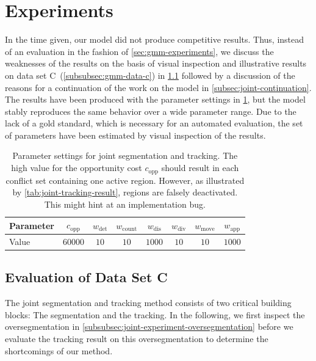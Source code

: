 \section{Experiments}
\label{sec:joint-experiments}
In the time given, our model did not produce competitive results. Thus, instead of an evaluation in
the fashion of \cref{sec:gmm-experiments}, we discuss the weaknesses of the results on the basis of
visual inspection and illustrative results on data set C~(\cref{subsubsec:gmm-data-c}) in
\cref{subsec:joint-experiment-c} followed by a discussion of the reasons for a continuation of the
work on the model in \cref{subsec:joint-continuation}. The results have been produced with the
parameter settings in \cref{tab:joint-experiments-par}, but the model stably reproduces the same
behavior over a wide parameter range. Due to the lack of a gold standard, which is necessary for an
automated evaluation, the set of parameters have been estimated by visual inspection of the results.
\begin{table}
    \centering
    \renewcommand*{\arraystretch}{1.2}
    \begin{tabular}{l|ccccccc}
        \toprule
        Parameter &  
        $c_{\text{opp}}$ &
        $w_{\text{det}}$ & 
        $w_{\text{count}}$ & 
        $w_{\text{dis}}$ & 
        $w_{\text{div}}$ & 
        $w_{\text{move}}$ & 
        $w_{\text{app}}$ \\ \hline
        Value &  $60000$ & $10$ & $10$ & $1000$ & $10$  & $10$ & $1000$ \\
        \bottomrule
    \end{tabular}
    \renewcommand*{\arraystretch}{1.0}
    \caption[Parameter settings for joint segmentation and tracking]{Parameter settings for joint segmentation and tracking. The high value for the
        opportunity cost $c_{\text{opp}}$ should result in each conflict set containing one active
        region. However, as illustrated by \cref{tab:joint-tracking-result}, regions are falsely
        deactivated. This might hint at an implementation bug.}
    \label{tab:joint-experiments-par}
\end{table}

\subsection{Evaluation of Data Set C}
\label{subsec:joint-experiment-c}
The joint segmentation and tracking method consists of two critical building blocks: The
segmentation and the tracking. In the following, we first inspect the oversegmentation in
\cref{subsubsec:joint-experiment-oversegmentation} before we evaluate the tracking result on this
oversegmentation to determine the shortcomings of our method.

